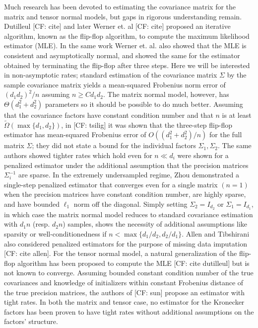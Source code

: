 \documentclass{article}
\newcommand{\CF}[1]{{\color{purple}[CF: #1]}}
\begin{document}
Much research has been devoted to estimating the covariance matrix for the matrix and tensor normal models, but gaps in rigorous understanding remain. Dutilleul \CF{cite} and later Werner et. al \CF{cite} proposed an iterative algorithm, known as the flip-flop algorithm, to compute the maximum likelihood estimator (MLE). In the same work Werner et. al. also showed that the MLE is consistent and asymptotically normal, and showed the same for the estimator obtained by terminating the flip-flop after three steps. Here we will be interested in non-asymptotic rates; standard estimation of the covariance matrix $\Sigma$ by the sample covariance matrix yields a mean-squared Frobenius norm error of $(d_1 d_2)^2/n$ assuming $n \geq C d_1 d_2$. The matrix normal model, however, has $\Theta(d_1^2 + d_2^2)$ parameters so it should be possible to do much better. Assuming that the covariance factors have constant condition number and that $n$ is at least $\tilde{\Omega}(\max\{d_1,d_2\})$, in \CF{tsilig} it was shown that the three-step flip-flop estimator has mean-squared Frobenius error of $O((d_1^2 + d_2^2)/n)$ for the full matrix $\Sigma$; they did not state a bound for the individual factors $\Sigma_1,\Sigma_2$. The same authors showed tighter rates which hold even for $n\ll d_i$ were shown for a penalized estimator under the additional assumption that the precision matrices $\Sigma_i^{-1}$ are sparse. In the extremely undersampled regime, Zhou demonstrated a single-step penalized estimator that converges even for a single matrix $(n=1)$ when the precision matrices have constant condition number, are highly sparse, and have bounded $\ell_1$ norm off the diagonal. Simply setting $\Sigma_2 = I_{d_2}$ or $\Sigma_1 = I_{d_1}$, in which case the matrix normal model reduces to standard covariance estimation with $d_1n$ (resp. $d_2 n$) samples, shows the necessity of additional assumptions like sparsity or well-conditionedness if $n < \max\{d_1/d_2, d_2/d_1\}$. Allen and Tibshirani also considered penalized estimators for the purpose of missing data imputation \CF{cite allen}. For the tensor normal model, a natural generalization of the flip-flop algorithm has been proposed to compute the MLE \CF{cite dutilleul} but is not known to converge. Assuming bounded constant condition number of the true covariances and knowledge of initializers within constant Frobenius distance of the true precision matrices, the authors of \CF{sun} propose an estimator with tight rates. In both the matrix and tensor case, no estimator for the Kronecker factors has been proven to have tight rates without additional assumptions on the factors' structure.
\end{document}
